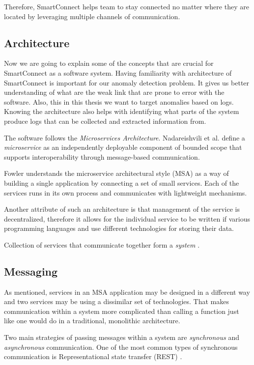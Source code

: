 Therefore, SmartConnect helps team to stay connected no matter where they are located by leveraging multiple channels of communication. 

\subsection{Architecture}

Now we are going to explain some of the concepts that are crucial for SmartConnect as a software system. 
Having familiarity with architecture of SmartConnect is important for our anomaly detection problem. It gives us better understanding of what are the weak link that are prone to error with the software. Also, this in this thesis we want to target anomalies based on logs. Knowing the architecture also helps with identifying what parts of the system produce logs that can be collected and extracted information from.

The software follows the \textit{Microservices Architecture}.
Nadareishvili et al. \cite{nadareishvili2016microservice} define a \textit{microservice} as an independently deployable component of bounded scope that supports interoperability through message-based communication. 

Fowler \cite{fowler2014microservices} understands the microservice architectural style (MSA) as a way of building a single application by connecting a set of small services. Each of the services runs in its own process and communicates with lightweight mechanisms.

Another attribute of such an architecture is that management of the service is decentralized, therefore it allows for the individual service to be written if various programming languages and use different technologies for storing their data.

Collection of services that communicate together form a \textit{system} \cite{indrasiri2018microservices}.

\subsection{Messaging}
As mentioned, services in an MSA application may be designed in a different way and two services may be using a dissimilar set of technologies. That makes communication within a system more complicated than calling a function just like one would do in a traditional, monolithic architecture.

Two main strategies of passing messages within a system are \textit{synchronous} and \textit{asynchronous} communication. One of the most common types of synchronous communication is Representational state transfer (REST) \cite{indrasiri2018microservices}.

